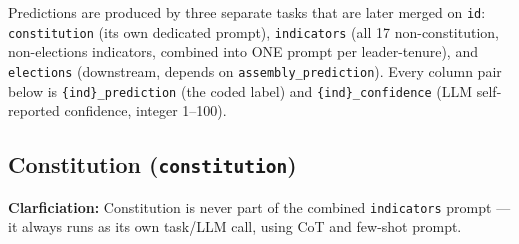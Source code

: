 \documentclass[11pt, a4paper]{article}
\newenvironment{promptquote}{%
  \begin{quote}\small
}{%
  \end{quote}
}
\begin{document}
Predictions are produced by three separate tasks that are later merged on \texttt{id}:
\texttt{constitution} (its own dedicated prompt), \texttt{indicators} (all 17 non-constitution,
non-elections indicators, combined into ONE prompt per leader-tenure), and \texttt{elections}
(downstream, depends on \texttt{assembly\_\allowbreak prediction}). Every column pair
below is \texttt{\{ind\}\_\allowbreak prediction} (the coded label) and
\texttt{\{ind\}\_\allowbreak confidence} (LLM self-reported confidence, integer 1--100).


\subsection{Constitution (\texttt{constitution})}

\textbf{Clarficiation:} Constitution is never part of the combined \texttt{indicators} prompt — 
it always runs as its own task/LLM call, using CoT and few-shot prompt.




\end{document}
